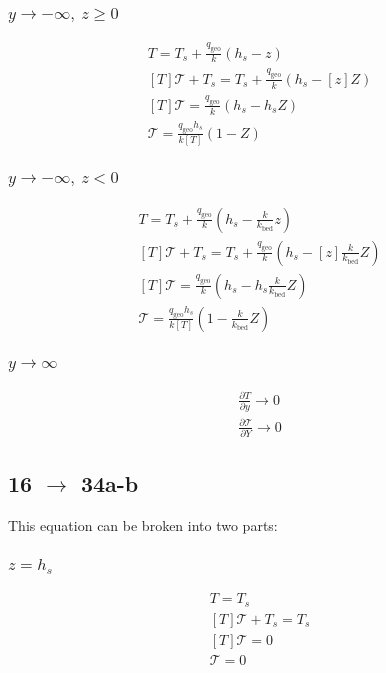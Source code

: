 \documentclass[10pt, letterpaper, twoside]{article}
\newcommand{\pd}[2]{\frac{\partial#1}{\partial#2}}
\begin{document}
	\subsubsection{$ y\rightarrow-\infty,\ z\geq0 $}
	\begin{gather*}
		T = T_s + \frac{q_{\text{geo}}}{k}\left(h_s-z\right) \tag{14a} \\
		\left[T\right]\mathcal{T} + T_s = T_s + \frac{q_{\text{geo}}}{k}\left(h_s-\left[z\right]Z\right)\\
		\left[T\right]\mathcal{T} = \frac{q_{\text{geo}}}{k}\left(h_s-h_sZ\right)\\
		\mathcal{T} = \frac{q_{\text{geo}}h_s}{k\left[T\right]}\left(1-Z\right) \tag{14a'}
	\end{gather*}
	\subsubsection{$ y\rightarrow-\infty,\ z<0 $}
	\begin{gather*}
		T = T_s + \frac{q_{\text{geo}}}{k}\left(h_s-\frac{k}{k_{\text{bed}}}z\right) \tag{14b} \\
		\left[T\right]\mathcal{T} + T_s = T_s + \frac{q_{\text{geo}}}{k}\left(h_s-\left[z\right]\frac{k}{k_{\text{bed}}}Z\right)\\
		\left[T\right]\mathcal{T} = \frac{q_{\text{geo}}}{k}\left(h_s-h_s\frac{k}{k_{\text{bed}}}Z\right)\\
		\mathcal{T} = \frac{q_{\text{geo}}h_s}{k\left[T\right]}\left(1-\frac{k}{k_{\text{bed}}}Z\right) \tag{14b'}
	\end{gather*}
	\subsubsection{$ y\rightarrow\infty $}
	\begin{gather*}
		\pd{T}{y}\rightarrow 0 \tag{14c} \\
		\pd{\mathcal{T}}{Y} \rightarrow 0 \tag{14c'}
	\end{gather*}
	\subsection{16 $ \rightarrow $ 34a-b}
	This equation can be broken into two parts:
	\subsubsection{$ z=h_s $}
	\begin{gather*}
		T = T_s \tag{16a} \\
		\left[T\right]\mathcal{T} + T_s = T_s\\
		\left[T\right]\mathcal{T} = 0\\
		\mathcal{T} = 0 \tag{16a'}
	\end{gather*}
\end{document}
